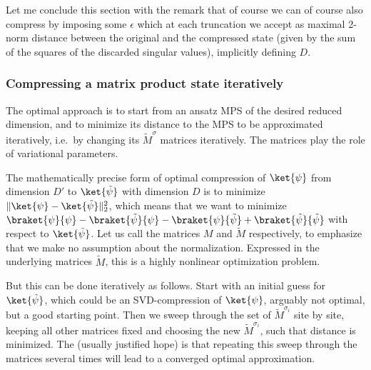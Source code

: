 Let me conclude this section with the remark that of course we can of course also compress by imposing some $\epsilon$ which at each truncation we accept as maximal 2-norm distance between the original and the compressed state (given by the sum of the squares of the discarded singular values), implicitly defining $D$. 

\subsubsection{Compressing a matrix product state iteratively}
The optimal approach is to start from an ansatz MPS of the desired reduced dimension, and to minimize its distance to the MPS to be approximated iteratively, i.e.\ by changing its $\tilde{M}^\sigma$ matrices iteratively. The matrices play the role of variational parameters.

The mathematically precise form of optimal compression of $\ket{\psi}$ from dimension $D'$ to $\ket{\tilde{\psi}}$ with dimension $D$ is to minimize $\| \ket{\psi} - \ket{\tilde{\psi}} \|_2^2$, which means that we want to minimize $\braket{\psi}{\psi} - \braket{\tilde{\psi}}{\psi} -\braket{\psi}{\tilde{\psi}} + \braket{\tilde{\psi}}{\tilde{\psi}}$ with respect to $\ket{\tilde{\psi}}$. Let us call the matrices $M$ and $\tilde{M}$ respectively, to emphasize that we make no assumption about the normalization. Expressed in the underlying matrices $\tilde{M}$, this is a highly nonlinear optimization problem.

But this can be done iteratively as follows. Start with an initial guess for $\ket{\tilde{\psi}}$, which could be an SVD-compression of $\ket{\psi}$, arguably not optimal, but a good starting point. Then we sweep through the set of $\tilde{M}^{\sigma_i}$ site by site, keeping all other matrices fixed and choosing the new $\tilde{M}^{\sigma_i}$, such that distance is minimized. The (usually justified hope) is that repeating this sweep through the matrices several times will lead to a converged optimal approximation.

